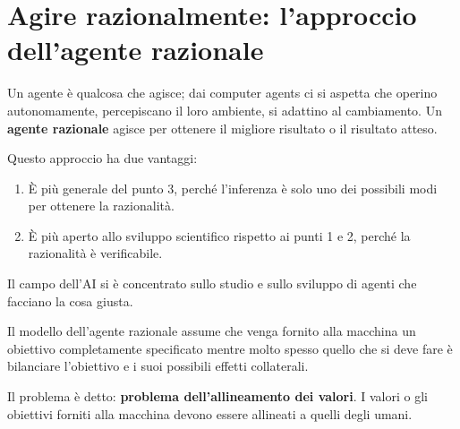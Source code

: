 \section{Agire razionalmente: l'approccio dell'agente razionale}

Un agente \`e qualcosa che agisce; dai computer agents ci si aspetta che operino autonomamente, percepiscano il loro ambiente, si adattino al cambiamento.
Un \textbf{agente razionale} agisce per ottenere il migliore risultato o il risultato atteso.

Questo approccio ha due vantaggi:
\begin{enumerate}
  \item \`E pi\`u generale del punto 3, perch\'e l'inferenza \`e solo uno dei possibili modi per ottenere la razionalit\`a.
  \item \`E pi\`u aperto allo sviluppo scientifico rispetto ai punti 1 e 2, perch\'e la razionalit\`a \`e verificabile.
\end{enumerate}

Il campo dell'AI si \`e concentrato sullo studio e sullo sviluppo di agenti che facciano la cosa giusta.

Il modello dell'agente razionale assume che venga fornito alla macchina un obiettivo completamente specificato mentre molto spesso quello che si deve fare \`e bilanciare l'obiettivo e i suoi possibili effetti collaterali.

Il problema \`e detto: \textbf{problema dell'allineamento dei valori}. I valori o gli obiettivi forniti alla macchina devono essere allineati a quelli degli umani.

